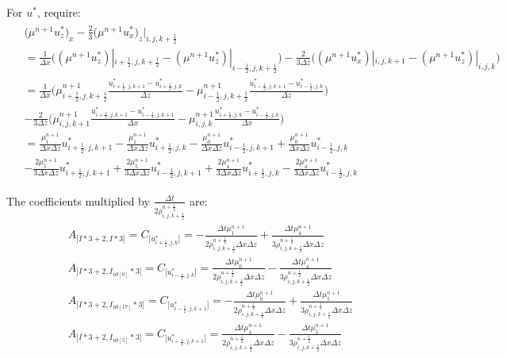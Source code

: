 \documentclass{article}
\numberwithin{equation}{subsection}
\begin{document}
For $u^*$, require:
\begin{align}
\begin{split}
& \Big(\mu^{n+1}u^*_z\Big)_x - \frac{2}{3}\Big(\mu^{n+1}u^*_x\Big)_z |_{i,j,k+\frac{1}{2}} \\
& = \frac{1}{\Delta x}\Big((\mu^{n+1}u^*_z)|_{i+\frac{1}{2},j,k+\frac{1}{2}} - (\mu^{n+1}u^*_z)|_{i-\frac{1}{2},j,k+\frac{1}{2}}\Big) -\frac{2}{3\Delta z}\Big((\mu^{n+1}u^*_x)|_{i,j,k+1} - (\mu^{n+1}u^*_z)|_{i,j,k}\Big) \\
& = \frac{1}{\Delta x}\Big(\mu^{n+1}_{i+\frac{1}{2},j,k+\frac{1}{2}}\frac{u^*_{i+\frac{1}{2},j,k+1}-u^*_{i+\frac{1}{2},j,k}}{\Delta z} -\mu^{n+1}_{i-\frac{1}{2},j,k+\frac{1}{2}}\frac{u^*_{i-\frac{1}{2},j,k+1}-u^*_{i-\frac{1}{2},j,k}}{\Delta z} \Big)\\
& -\frac{2}{3\Delta z}\Big(\mu^{n+1}_{i,j,k+1}\frac{u^*_{i+\frac{1}{2},j,k+1}-u^*_{i-\frac{1}{2},j,k+1}}{\Delta x} - \mu^{n+1}_{i,j,k}\frac{u^*_{i+\frac{1}{2},j,k}-u^*_{i-\frac{1}{2},j,k}}{\Delta x} \Big)\\
& = \frac{\mu^{n+1}_1}{\Delta x \Delta z}u^*_{i+\frac{1}{2},j,k+1} - \frac{\mu^{n+1}_1}{\Delta x \Delta z}u^*_{i+\frac{1}{2},j,k} - \frac{\mu^{n+1}_0}{\Delta x \Delta z}u^*_{i-\frac{1}{2},j,k+1} + \frac{\mu^{n+1}_0}{\Delta x \Delta z}u^*_{i-\frac{1}{2},j,k} \\
& - \frac{2\mu^{n+1}_5}{3\Delta x \Delta z}u^*_{i+\frac{1}{2},j,k+1} + \frac{2\mu^{n+1}_5}{3\Delta x \Delta z} u^*_{i-\frac{1}{2},j,k+1} + \frac{2\mu^{n+1}_4}{3\Delta x \Delta z}u^*_{i+\frac{1}{2},j,k} - \frac{2\mu^{n+1}_4}{3\Delta x \Delta z}u^*_{i-\frac{1}{2},j,k}
\end{split}
\end{align}

The coefficients multiplied by $\frac{\Delta t}{2\rho^{n+\frac{1}{2}}_{i,j,k+\frac{1}{2}}}$ are:
\begin{align}
\begin{split}
& A_{\Big[I*3+2,I*3\Big]} = C_{\Big[u^*_{i+\frac{1}{2},j,k}\Big]} = -\frac{\Delta t \mu^{n+1}_1}{2\rho^{n+\frac{1}{2}}_{i,j,k+\frac{1}{2}}\Delta x \Delta z} + \frac{\Delta t \mu^{n+1}_4}{3\rho^{n+\frac{1}{2}}_{i,j,k+\frac{1}{2}} \Delta x \Delta z}  \\
& A_{\Big[I*3+2,I_{nb[0]}*3\Big]} = C_{\Big[u^*_{i-\frac{1}{2},j,k}\Big]} = \frac{\Delta t \mu^{n+1}_0}{2\rho^{n+\frac{1}{2}}_{i,j,k+\frac{1}{2}} \Delta x \Delta z} - \frac{\Delta t \mu^{n+1}_4}{3\rho^{n+\frac{1}{2}}_{i,j,k+\frac{1}{2}} \Delta x \Delta z} \\
& A_{\Big[I*3+2,I_{nb[17]}*3\Big]} = C_{\Big[u^*_{i-\frac{1}{2},j,k+1}\Big]} = -\frac{\Delta t \mu^{n+1}_0}{2\rho^{n+\frac{1}{2}}_{i,j,k+\frac{1}{2}}\Delta x \Delta z} + \frac{\Delta t \mu^{n+1}_5}{3\rho^{n+\frac{1}{2}}_{i,j,k+\frac{1}{2}}\Delta x \Delta z}\\
& A_{\Big[I*3+2,I_{nb[5]}*3\Big]} = C_{\Big[u^*_{i+\frac{1}{2},j,k+1}\Big]} = \frac{\Delta t \mu^{n+1}_1}{2\rho^{n+\frac{1}{2}}_{i,j,k+\frac{1}{2}}\Delta x \Delta z} - \frac{\Delta t \mu^{n+1}_5}{3\rho^{n+\frac{1}{2}}_{i,j,k+\frac{1}{2}}\Delta x \Delta z} \\
\end{split}
\end{align}
\end{document}
